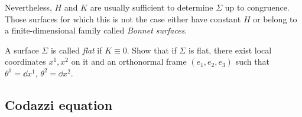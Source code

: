 Nevertheless, $H$ and $K$ are usually sufficient to determine $\Sigma$ up to congruence. Those surfaces for which this is not the case either have constant $H$ or belong to a finite-dimensional family called \emph{Bonnet surfaces}.

\begin{xca}
    A surface $\Sigma$ is called \emph{flat} if $K\equiv 0$. Show that if $\Sigma$ is flat, there exist local coordinates $x^1,x^2$ on it and an orthonormal frame $(e_1,e_2,e_3)$ such that $\theta^1=\dd x^1$, $\theta^2=\dd x^2$.
\end{xca}





\subsection{Codazzi equation}

